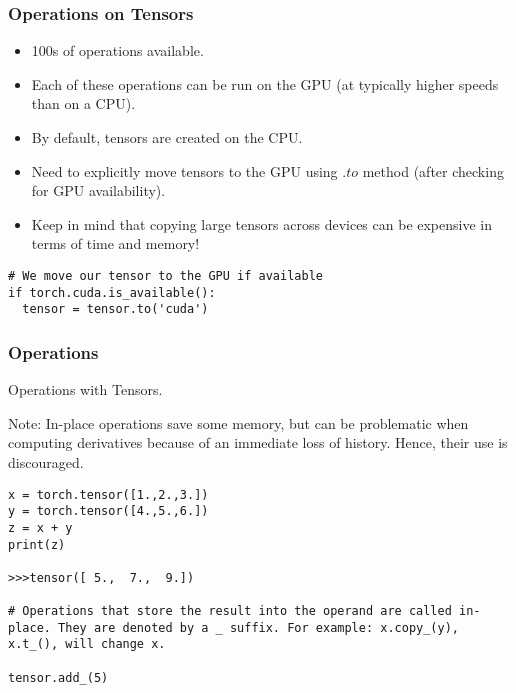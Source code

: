 \begin{frame}[fragile]
\frametitle{Operations on Tensors}
\begin{itemize}
\item 100s of operations available.
\item Each of these operations can be run on the GPU (at typically higher speeds than on a CPU).
\item By default, tensors are created on the CPU. 
\item Need to explicitly move tensors to the GPU using $.to$ method (after checking for GPU availability). 
\item Keep in mind that copying large tensors across devices can be expensive in terms of time and memory!
\end{itemize}

 \begin{lstlisting}
# We move our tensor to the GPU if available
if torch.cuda.is_available():
  tensor = tensor.to('cuda')
 \end{lstlisting}

 \end{frame} 
 
 
 
\begin{frame}[fragile]
\frametitle{Operations}
Operations with Tensors.

 Note:  In-place operations save some memory, but can be problematic when computing derivatives because of an immediate loss of history. Hence, their use is discouraged.
 
 
 \begin{lstlisting}
x = torch.tensor([1.,2.,3.])
y = torch.tensor([4.,5.,6.])
z = x + y
print(z)

>>>tensor([ 5.,  7.,  9.])

# Operations that store the result into the operand are called in-place. They are denoted by a _ suffix. For example: x.copy_(y), x.t_(), will change x.
 
tensor.add_(5)
\end{lstlisting}

\end{frame} 
 
